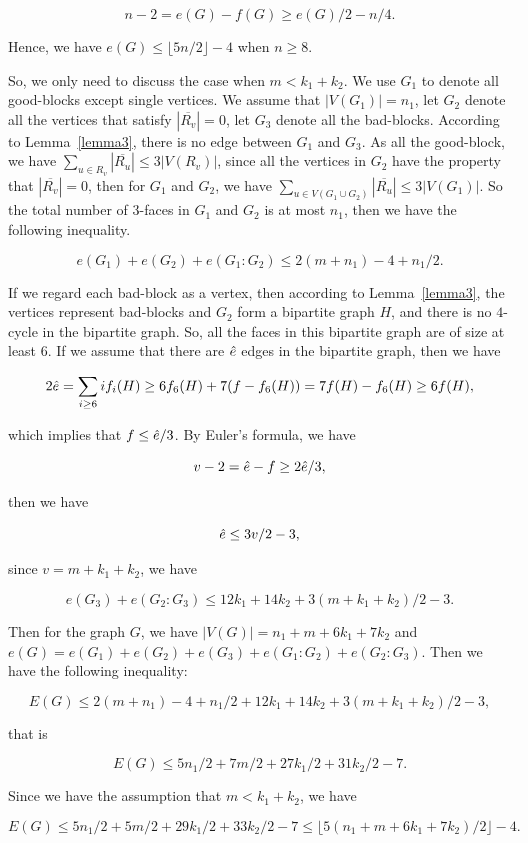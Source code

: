 \documentclass[12pt]{article}
\begin{document}
$$n-2=e(G)-f(G)\geq e(G)/2-n/4.$$

Hence, we have $e(G) \leq \lfloor 5n/2 \rfloor - 4$ when $n\geq8$.

So, we only need to discuss the case when $m < k_1+k_2$. We use $G_1$ to denote all good-blocks except single vertices. We assume that $|V(G_1)|=n_1$, let $G_2$ denote all the vertices that satisfy $|\overline{R_v}|=0$, let $G_3$ denote all the bad-blocks. According to Lemma~\ref{lemma3}, there is no edge between $G_1$ and $G_3$. As all the good-block, we have $\sum_{u \in R_v}|\overline{R_u}| \leq 3|V(R_v)|$, since all the vertices in $G_2$ have the property that $|\overline{R_v}|=0$, then for $G_1$ and $G_2$, we have $\sum_{u \in V(G_1 \cup G_2)}|\overline{R_u}| \leq 3|V(G_1)|$. So the total number of $3$-faces in $G_1$ and $G_2$ is at most $n_1$, then we have the following inequality.

$$e(G_1)+e(G_2)+e(G_1:G_2) \leq 2(m+n_1)-4+n_1/2.$$

If we regard each bad-block as a vertex, then according to Lemma~\ref{lemma3}, the vertices represent bad-blocks and $G_2$ form a bipartite graph $H$, and there is no $4$-cycle in the bipartite graph. So, all the faces in this bipartite graph are of size at least $6$. If we assume that there are $\Hat{e}$ edges in the bipartite graph, then we have

$$2\Hat{e}=\sum_{i\geq6}if_i(H) \geq 6f_6(H)+7(f-f_6(H))=7f(H)-f_6(H) \geq 6f(H),$$

which implies that $f \leq \Hat{e}/3$. By Euler’s formula, we have

$$v-2=\Hat{e}-f \geq 2\Hat{e}/3,$$

then we have

$$\Hat{e} \leq 3v/2-3,$$

since $v=m+k_1+k_2$, we have

$$e(G_3)+e(G_2:G_3) \leq 12k_1+14k_2+3(m+k_1+k_2)/2-3.$$

Then for the graph $G$, we have $|V(G)|=n_1+m+6k_1+7k_2$ and $e(G)=e(G_1)+e(G_2)+e(G_3)+e(G_1:G_2)+e(G_2:G_3)$. Then we have the following inequality:

$$E(G) \leq 2(m+n_1)-4+n_1/2+12k_1+14k_2+3(m+k_1+k_2)/2-3,$$

that is

$$E(G) \leq 5n_1/2+7m/2+27k_1/2+31k_2/2-7.$$


Since we have the assumption that $m < k_1+k_2$, we have

$$E(G) \leq 5n_1/2+5m/2+29k_1/2+33k_2/2-7 \leq \lfloor 5(n_1+m+6k_1+7k_2)/2 \rfloor - 4.$$
\end{document}
